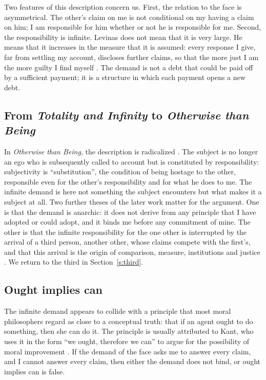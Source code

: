 \documentclass{situationist-preprint}
\begin{document}
Two features of this description concern us. First, the relation to the face is asymmetrical. The other's claim on me is not conditional on my having a claim on him; I am responsible for him whether or not he is responsible for me. Second, the responsibility is infinite. Levinas does not mean that it is very large. He means that it increases in the measure that it is assumed: every response I give, far from settling my account, discloses further claims, so that the more just I am the more guilty I find myself \citep[III.B]{Levinas1961}. The demand is not a debt that could be paid off by a sufficient payment; it is a structure in which each payment opens a new debt.

\subsection{From \emph{Totality and Infinity} to \emph{Otherwise than Being}}

In \emph{Otherwise than Being}, the description is radicalized \citep{Levinas1974}. The subject is no longer an ego who is subsequently called to account but is constituted by responsibility: subjectivity is \enquote{substitution}, the condition of being hostage to the other, responsible even for the other's responsibility and for what he does to me. The infinite demand is here not something the subject encounters but what makes it a subject at all. Two further theses of the later work matter for the argument. One is that the demand is anarchic: it does not derive from any principle that I have adopted or could adopt, and it binds me before any commitment of mine. The other is that the infinite responsibility for the one other is interrupted by the arrival of a third person, another other, whose claims compete with the first's, and that this arrival is the origin of comparison, measure, institutions and justice \citep[V.3]{Levinas1974}. We return to the third in Section~\ref{s:third}.

\subsection{Ought implies can}

The infinite demand appears to collide with a principle that most moral philosophers regard as close to a conceptual truth: that if an agent ought to do something, then she can do it. The principle is usually attributed to Kant, who uses it in the form \enquote{we ought, therefore we can} to argue for the possibility of moral improvement \citep{Kant1793}. If the demand of the face asks me to answer every claim, and I cannot answer every claim, then either the demand does not bind, or ought implies can is false.
\end{document}
